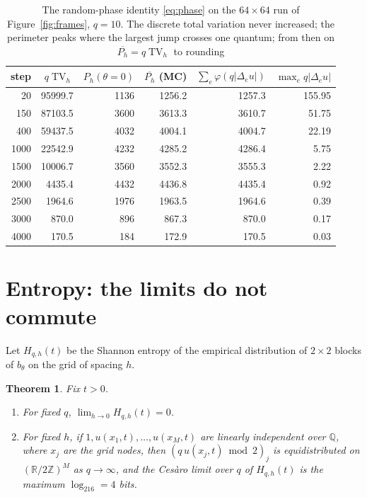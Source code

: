 \documentclass[11pt,a4paper]{article}
\newtheorem{theorem}{Theorem}[section]
\theoremstyle{definition}
\theoremstyle{remark}
\newcommand{\R}{\mathbb{R}}
\newcommand{\Z}{\mathbb{Z}}
\newcommand{\Q}{\mathbb{Q}}
\newcommand{\TV}{\operatorname{TV}}
\begin{document}
\begin{table}[ht]
\centering
\begin{tabular}{@{}rrrrrr@{}}
\toprule
step & $q\TV_h$ & $P_h(\theta=0)$ & $\overline{P_h}$ (MC) & $\sum_e\varphi(q|\Delta_eu|)$ & $\max_eq|\Delta_eu|$ \\
\midrule
   20 & 95999.7 & 1136 & 1256.2 & 1257.3 & 155.95 \\
  150 & 87103.5 & 3600 & 3613.3 & 3610.7 &  51.75 \\
  400 & 59437.5 & 4032 & 4004.1 & 4004.7 &  22.19 \\
 1000 & 22542.9 & 4232 & 4285.2 & 4286.4 &   5.75 \\
 1500 & 10006.7 & 3560 & 3552.3 & 3555.3 &   2.22 \\
 2000 &  4435.4 & 4432 & 4436.8 & 4435.4 &   0.92 \\
 2500 &  1964.6 & 1976 & 1963.5 & 1964.6 &   0.39 \\
 3000 &   870.0 &  896 &  867.3 &  870.0 &   0.17 \\
 4000 &   170.5 &  184 &  172.9 &  170.5 &   0.03 \\
\bottomrule
\end{tabular}
\caption{The random-phase identity \eqref{eq:phase} on the $64\times64$
run of Figure~\ref{fig:frames}, $q=10$. The discrete total variation never
increased; the perimeter peaks where the largest jump crosses one quantum;
from then on $\overline{P_h}=q\TV_h$ to rounding}
\label{tab:phase}
\end{table}

\section{Entropy: the limits do not commute}\label{sec:entropy}

Let $H_{q,h}(t)$ be the Shannon entropy of the empirical distribution of
$2\times2$ blocks of $b_\theta$ on the grid of spacing $h$.

\begin{theorem}\label{thm:entropy}
Fix $t>0$.
\begin{enumerate}
\item For fixed $q$, $\lim_{h\to0}H_{q,h}(t)=0$.
\item For fixed $h$, if $1,u(x_1,t),\dots,u(x_M,t)$ are linearly independent over $\Q$, where $x_j$ are the grid nodes, then $(q\,u(x_j,t)\bmod2)_{j}$ is equidistributed on $(\R/2\Z)^M$ as $q\to\infty$, and the Ces\`aro limit over $q$ of $H_{q,h}(t)$ is the maximum $\log_216=4$ bits.
\end{enumerate}
\end{theorem}
\end{document}
